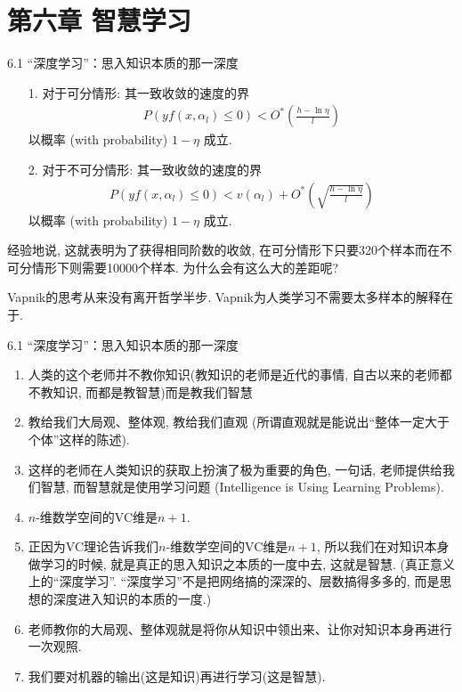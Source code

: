 \documentclass[compress,10pt,dvipsnames,notheorems]{beamer} %
\begin{document}
\section{第六章 智慧学习}
\begin{frame}{6.1 “深度学习”：思入知识本质的那一深度}
\begin{enumerate}
\item[1.] \textsf{对于可分情形:} 其一致收敛的速度的界
\begin{align*}
P(yf(x, \alpha_{l}) \leq 0) < O^{*}\left(\frac{h - \ln \eta}{l}\right)
\end{align*}
以概率 (with probability) $1-\eta$ 成立.
\item[2.] \textsf{对于不可分情形:} 其一致收敛的速度的界
\begin{align*}
P(yf(x, \alpha_{l}) \leq 0) < v(\alpha_{l}) + O^{*}\left(\sqrt{\frac{h - \ln \eta}{l}}\right)
\end{align*}
以概率 (with probability) $1-\eta$ 成立.
\end{enumerate}
\begin{solu}
经验地说, 这就表明为了获得相同阶数的收敛, 在可分情形下只要320个样本而在不可分情形下则需要10000个样本. 为什么会有这么大的差距呢? 

Vapnik的思考从来没有离开哲学半步. Vapnik为人类学习不需要太多样本的解释在于{\color{red}{“人类的学习快速是因为人类有个老师”}}.
\end{solu}
\end{frame}

\begin{frame}{6.1 “深度学习”：思入知识本质的那一深度}
\begin{enumerate}
\item 人类的这个老师并不教你知识(教知识的老师是近代的事情, 自古以来的老师都不教知识, 而都是教智慧)而是教我们智慧
\item 教给我们大局观、整体观, 教给我们直观 (所谓直观就是能说出“整体一定大于个体”这样的陈述). 
\item 这样的老师在人类知识的获取上扮演了极为重要的角色, 一句话, 老师提供给我们智慧, 而\textsf{智慧就是使用学习问题} (Intelligence is Using Learning Problems).
\item $n$-维数学空间的VC维是$n+1$.
\item 正因为VC理论告诉我们$n$-维数学空间的VC维是$n+1$, 所以我们在对知识本身做学习的时候, 就是真正的思入知识之本质的一度中去, 这就是智慧. (真正意义上的“深度学习”. “深度学习”不是把网络搞的深深的、层数搞得多多的, 而是思想的深度进入知识的本质的一度.)
\item 老师教你的大局观、整体观就是将你从知识中领出来、让你对知识本身再进行一次观照.
\item 我们要对机器的输出(这是知识)再进行学习(这是智慧).
\end{enumerate}
\end{frame}
\end{document}
